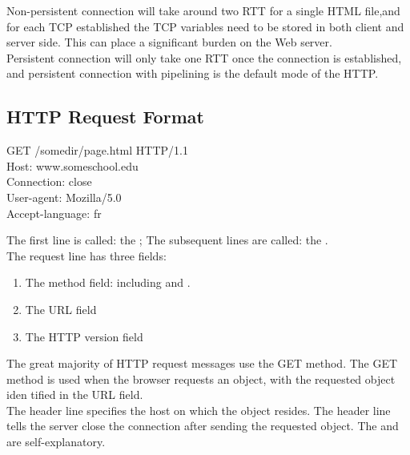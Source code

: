 
Non-persistent connection will take around two RTT for a single HTML file,and for each TCP established the TCP
variables need to be stored in both client and server side. This can place a significant burden on the Web server.\\

Persistent connection will only take one RTT once the connection is
established, and persistent connection with pipelining is the default mode of the HTTP.


\subsection{HTTP Request Format}
\begin{center}
    GET /somedir/page.html HTTP/1.1\\
    Host: www.someschool.edu\\
    Connection: close\\
    User-agent: Mozilla/5.0\\
    Accept-language: fr
    \label{c2_http_request}
\end{center}

The first line is called: the ;
The subsequent lines are called: the .\\
The request line has three fields:
\begin{enumerate}
    \item The method field: including  and .
    \item The URL field
    \item The HTTP version field
\end{enumerate}

The great majority of HTTP request messages use the GET method. The GET
method is used when the browser requests an object, with the requested object iden tified in the URL field.\\

The header line  specifies the host on which the object resides. The header line 
tells the server close the connection after sending the requested object. The  and  are self-explanatory.\\

\newpage

